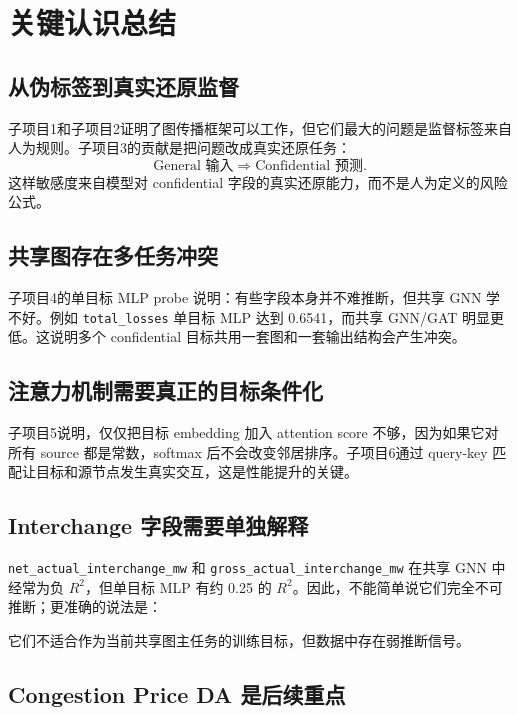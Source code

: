 \documentclass[UTF8]{ctexart}
\begin{document}
\section{关键认识总结}

\subsection{从伪标签到真实还原监督}

子项目1和子项目2证明了图传播框架可以工作，但它们最大的问题是监督标签来自人为规则。子项目3的贡献是把问题改成真实还原任务：
\[
\text{General 输入}
\Rightarrow
\text{Confidential 预测}.
\]
这样敏感度来自模型对 confidential 字段的真实还原能力，而不是人为定义的风险公式。

\subsection{共享图存在多任务冲突}

子项目4的单目标 MLP probe 说明：有些字段本身并不难推断，但共享 GNN 学不好。例如 \texttt{total\_losses} 单目标 MLP 达到 0.6541，而共享 GNN/GAT 明显更低。这说明多个 confidential 目标共用一套图和一套输出结构会产生冲突。

\subsection{注意力机制需要真正的目标条件化}

子项目5说明，仅仅把目标 embedding 加入 attention score 不够，因为如果它对所有 source 都是常数，softmax 后不会改变邻居排序。子项目6通过 query-key 匹配让目标和源节点发生真实交互，这是性能提升的关键。

\subsection{Interchange 字段需要单独解释}

\texttt{net\_actual\_interchange\_mw} 和 \texttt{gross\_actual\_interchange\_mw} 在共享 GNN 中经常为负 \(R^2\)，但单目标 MLP 有约 0.25 的 \(R^2\)。因此，不能简单说它们完全不可推断；更准确的说法是：

\begin{center}
它们不适合作为当前共享图主任务的训练目标，但数据中存在弱推断信号。
\end{center}

\subsection{Congestion Price DA 是后续重点}
\end{document}
